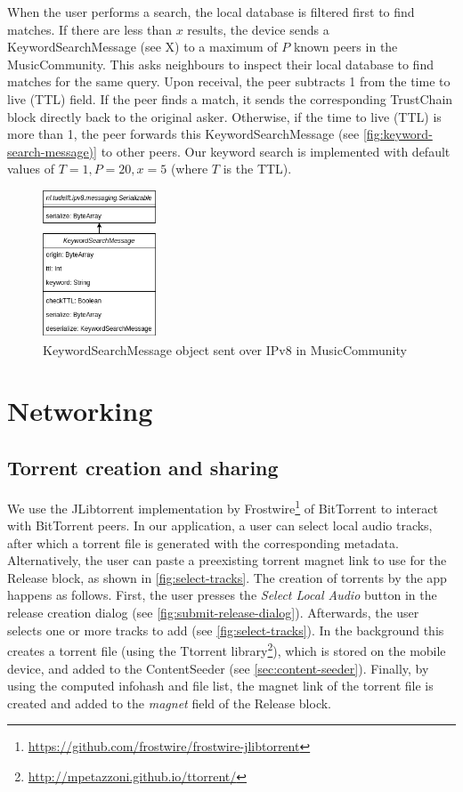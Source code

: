 When the user performs a search, the local database is filtered first to find matches. If there are less than \(x\) results, the device sends a KeywordSearchMessage (see X) to a maximum of \(P\) known peers in the MusicCommunity. This asks neighbours to inspect their local database to find matches for the same query. Upon receival, the peer subtracts 1 from the time to live (TTL) field. If the peer finds a match, it sends the corresponding TrustChain block directly back to the original asker. Otherwise, if the time to live (TTL) is more than 1, the peer forwards this KeywordSearchMessage (see \ref{fig:keyword-search-message)} to other peers. Our keyword search is implemented with default values of \(T=1, P=20, x=5\) (where \(T\) is the TTL).
\begin{figure}
    \includegraphics[width=0.3\textwidth]{implementation/keyword-search-message.png}
    \caption{KeywordSearchMessage object sent over IPv8 in MusicCommunity}
    \label{fig:keyword-search-message}
\end{figure}

\section{Networking}
\subsection{Torrent creation and sharing}
\label{sec:torrent-creation}
We use the JLibtorrent implementation by Frostwire\footnote{\url{https://github.com/frostwire/frostwire-jlibtorrent}} of BitTorrent to interact with BitTorrent peers. In our application, a user can select local audio tracks, after which a torrent file is generated with the corresponding metadata. Alternatively, the user can paste a preexisting torrent magnet link to use for the Release block, as shown in \ref{fig:select-tracks}. The creation of torrents by the app happens as follows. First, the user presses the \textit{Select Local Audio} button in the release creation dialog (see \ref{fig:submit-release-dialog}). Afterwards, the user selects one or more tracks to add (see \ref{fig:select-tracks}). In the background this creates a torrent file (using the Ttorrent library\footnote{\url{http://mpetazzoni.github.io/ttorrent/}}), which is stored on the mobile device, and added to the ContentSeeder (see \ref{sec:content-seeder}). Finally, by using the computed infohash and file list, the magnet link of the torrent file is created and added to the \textit{magnet} field of the Release block.

